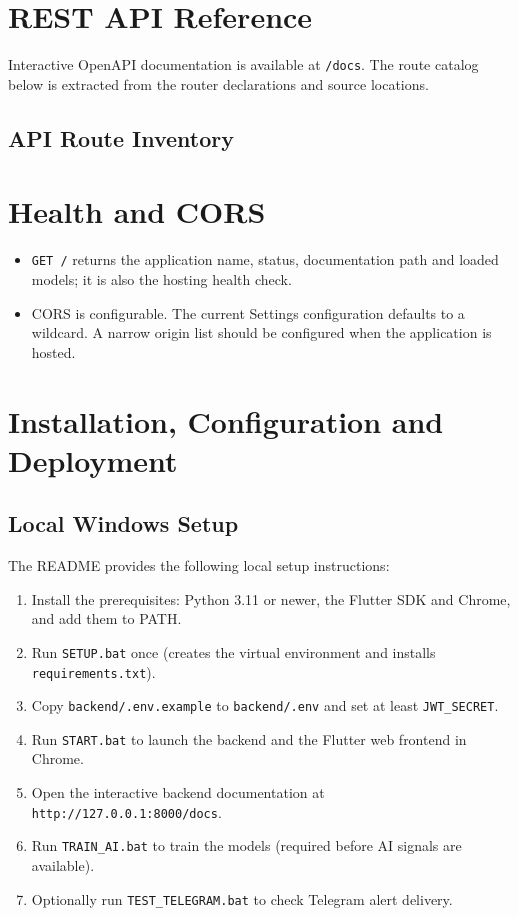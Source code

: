 \section{REST API Reference}
Interactive OpenAPI documentation is available at \texttt{/docs}. The route catalog below is extracted from the router declarations and source locations.
\subsection{API Route Inventory}


\section{Health and CORS}
\begin{itemize}
\item \texttt{GET /} returns the application name, status, documentation path and loaded models; it is also the hosting health check.
\item CORS is configurable. The current Settings configuration defaults to a wildcard. A narrow origin list should be configured when the application is hosted.
\end{itemize}

\section{Installation, Configuration and Deployment}
\subsection{Local Windows Setup}
The README provides the following local setup instructions:
\begin{enumerate}
\item Install the prerequisites: Python 3.11 or newer, the Flutter SDK and Chrome, and add them to PATH.
\item Run \texttt{SETUP.bat} once (creates the virtual environment and installs \texttt{requirements.txt}).
\item Copy \texttt{backend/.env.example} to \texttt{backend/.env} and set at least \texttt{JWT\_SECRET}.
\item Run \texttt{START.bat} to launch the backend and the Flutter web frontend in Chrome.
\item Open the interactive backend documentation at \texttt{http://127.0.0.1:8000/docs}.
\item Run \texttt{TRAIN\_AI.bat} to train the models (required before AI signals are available).
\item Optionally run \texttt{TEST\_TELEGRAM.bat} to check Telegram alert delivery.
\end{enumerate}

